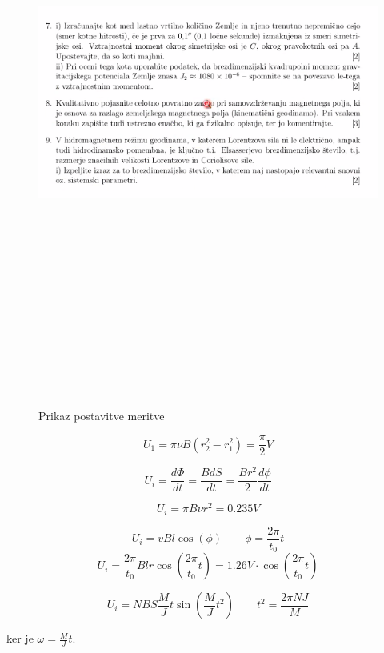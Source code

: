 \documentclass[11pt, a4paper]{article}
\theoremstyle{definition}
\theoremstyle{example}
\theoremstyle{izrek}
\begin{document}
\begin{figure}[H]
    \centering
    \includegraphics[width=17cm, height=20cm]{Screenshot 2.png}
    \caption{Prikaz postavitve meritve}
\end{figure}

\pagebreak


$$U_1=\pi \nu B (r_2^2-r_1^2)=\frac{\pi}{2}V$$

$$U_i=\frac{d\Phi}{dt}=\frac{BdS}{dt}=\frac{Br^2}{2}\frac{d\phi }{dt}$$

$$U_i=\pi B \nu r^2=0.235 V$$


$$U_i=v B l \cos(\phi) \qquad \phi=\frac{2\pi}{t_0}t$$
$$U_i=\frac{2 \pi}{t_0}Blr \cos(\frac{2 \pi}{t_0}t)=1.26 V \cdot \cos(\frac{2 \pi}{t_0}t)$$


$$U_i=NBS\frac{M}{J}t \sin(\frac{M}{J}t^2) \qquad t^2=\frac{2 \pi N J}{M}$$
\begin{center}
ker je $\omega=\frac{M}{J}t$.

\end{center}
\end{document}
